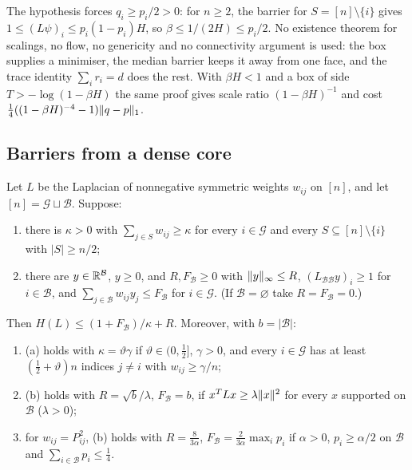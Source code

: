 \begin{remark}
The hypothesis forces $q_i\ge p_i/2>0$: for $n\ge2$, the barrier for
$S=[n]\setminus\{i\}$ gives $1\le(L\psi)_i\le p_i(1-p_i)H$, so
$\beta\le1/(2H)\le p_i/2$. No existence theorem for scalings, no flow, no
genericity and no connectivity argument is used: the box supplies a minimiser, the median barrier keeps it
away from one face, and the trace identity $\sum_ir_i=d$ does the rest. With
$\beta H<1$ and a box of side $T>-\log(1-\beta H)$ the same proof gives scale
ratio $(1-\beta H)^{-1}$ and cost $\frac14((1-\beta H)^{-4}-1)\lVert q-p\rVert_1$.
\end{remark}

\subsection{Barriers from a dense core}

\begin{lemma}\label{lem:core}
Let $L$ be the Laplacian of nonnegative symmetric weights $w_{ij}$ on $[n]$,
and let $[n]=\mathcal G\sqcup\mathcal B$. Suppose:
\begin{enumerate}[label=(\alph*)]
\item there is $\kappa>0$ with $\sum_{j\in S}w_{ij}\ge\kappa$ for every
$i\in\mathcal G$ and every $S\subseteq[n]\setminus\{i\}$ with $|S|\ge n/2$;
\item there are $y\in\mathbb R^{\mathcal B}$, $y\ge0$, and $R,F_{\mathcal B}\ge0$ with
$\lVert y\rVert_\infty\le R$, $(L_{\mathcal B\mathcal B}y)_i\ge1$ for $i\in\mathcal B$,
and $\sum_{j\in\mathcal B}w_{ij}y_j\le F_{\mathcal B}$ for $i\in\mathcal G$.
(If $\mathcal B=\varnothing$ take $R=F_{\mathcal B}=0$.)
\end{enumerate}
Then $H(L)\le(1+F_{\mathcal B})/\kappa+R$. Moreover, with $b=|\mathcal B|$:
\begin{enumerate}[label=(\roman*)]
\item (a) holds with $\kappa=\vartheta\gamma$ if $\vartheta\in(0,\frac12]$,
$\gamma>0$, and every $i\in\mathcal G$ has at least $(\frac12+\vartheta)n$ indices
$j\ne i$ with $w_{ij}\ge\gamma/n$;
\item (b) holds with $R=\sqrt b/\lambda$, $F_{\mathcal B}=b$, if
$x^TLx\ge\lambda\lVert x\rVert^2$ for every $x$ supported on $\mathcal B$ ($\lambda>0$);
\item for $w_{ij}=P_{ij}^2$, (b) holds with $R=\frac8{3\alpha}$,
$F_{\mathcal B}=\frac2{3\alpha}\max_ip_i$ if $\alpha>0$, $p_i\ge\alpha/2$ on
$\mathcal B$ and $\sum_{i\in\mathcal B}p_i\le\frac14$.
\end{enumerate}
\end{lemma}

